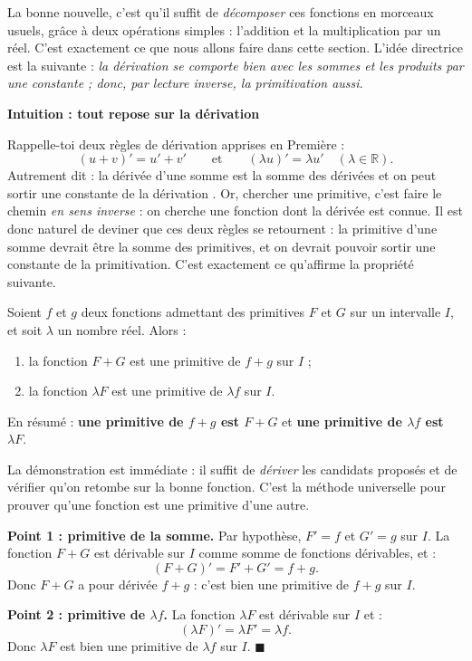 \documentclass[11pt]{article}
\newcommand{\cle}[1]{{\popxbold\color{popdark}#1}}
\newcounter{popsec}
\newcounter{popsub}
\newcommand{\courssub}[1]{%
  \stepcounter{popsub}%
  \par\vspace{9pt}\noindent{\popxbold\fontsize{11.5}{13}\selectfont\color{popink}{\color{poporange}\thepopsec.\thepopsub}\hspace{6pt}#1}\par\nopagebreak\vspace{4pt}
}
\begin{document}
La bonne nouvelle, c'est qu'il suffit de \emph{décomposer} ces fonctions en morceaux usuels, grâce à deux opérations simples : l'\cle{addition} et la \cle{multiplication par un réel}. C'est exactement ce que nous allons faire dans cette section. L'idée directrice est la suivante : \emph{la dérivation se comporte bien avec les sommes et les produits par une constante ; donc, par lecture inverse, la primitivation aussi}.

\courssub{Linéarité de la primitivation}

\textbf{Intuition : tout repose sur la dérivation}\par

Rappelle-toi deux règles de dérivation apprises en Première :
\[ (u + v)' = u' + v' \qquad \text{et} \qquad (\lambda u)' = \lambda u' \quad (\lambda \in \mathbb{R}). \]
Autrement dit : \og la dérivée d'une somme est la somme des dérivées \fg{} et \og on peut sortir une constante de la dérivation \fg. Or, chercher une primitive, c'est faire le chemin \emph{en sens inverse} : on cherche une fonction dont la dérivée est connue. Il est donc naturel de deviner que ces deux règles se \og retournent \fg{} : la primitive d'une somme devrait être la somme des primitives, et on devrait pouvoir sortir une constante de la primitivation. C'est exactement ce qu'affirme la propriété suivante.

\begin{propriete}
Soient $f$ et $g$ deux fonctions admettant des primitives $F$ et $G$ sur un intervalle $I$, et soit $\lambda$ un nombre réel. Alors :
\begin{enumerate}
\item la fonction $F + G$ est une primitive de $f + g$ sur $I$ ;
\item la fonction $\lambda F$ est une primitive de $\lambda f$ sur $I$.
\end{enumerate}
En résumé : \textbf{une primitive de $f+g$ est $F+G$} et \textbf{une primitive de $\lambda f$ est $\lambda F$}.
\end{propriete}

\begin{experience}
La démonstration est immédiate : il suffit de \emph{dériver} les candidats proposés et de vérifier qu'on retombe sur la bonne fonction. C'est la méthode universelle pour prouver qu'une fonction est une primitive d'une autre.

\textbf{Point 1 : primitive de la somme.} Par hypothèse, $F' = f$ et $G' = g$ sur $I$. La fonction $F + G$ est dérivable sur $I$ comme somme de fonctions dérivables, et :
\[ (F + G)' = F' + G' = f + g. \]
Donc $F + G$ a pour dérivée $f + g$ : c'est bien une primitive de $f + g$ sur $I$.

\textbf{Point 2 : primitive de $\lambda f$.} La fonction $\lambda F$ est dérivable sur $I$ et :
\[ (\lambda F)' = \lambda F' = \lambda f. \]
Donc $\lambda F$ est bien une primitive de $\lambda f$ sur $I$. \hfill$\blacksquare$
\end{experience}
\end{document}
